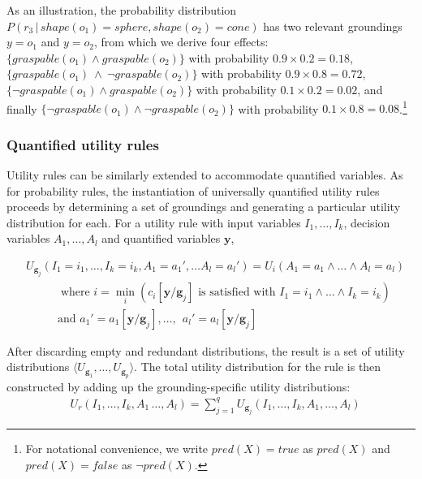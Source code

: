 As an illustration, the probability distribution $P(r_3 \, | \, \mathit{shape}(o_1)\!=\!\mathit{sphere}, \mathit{shape}(o_2)\!=\!\mathit{cone})$ has two relevant groundings $y\!=\!o_1$ and $y\!=\!o_2$, from which we derive four effects: $\{\mathit{graspable}(o_1) \land \mathit{graspable}(o_2) \} $ with probability $0.9\times0.2\!=\!0.18$, $\{\mathit{graspable}(o_1) \ \land \  \lnot\mathit{graspable}(o_2)\}$ with probability $0.9\times0.8\!=\!0.72$, $\{\lnot \mathit{graspable}(o_1) \land \mathit{graspable}(o_2) \}$ with probability $0.1\times0.2\!=\!0.02$, and finally $\{\lnot \mathit{graspable}(o_1) \land \lnot \mathit{graspable}(o_2)\}$ with probability $0.1\times0.8\!=\!0.08$.\footnote{For notational convenience, we write $pred(X)\!=\!true$ as $pred(X)$ and $pred(X)\!=\!false$ as $\lnot pred(X)$.}

\subsubsection*{Quantified utility rules}

Utility rules can be similarly extended to accommodate quantified variables. As for probability rules, the instantiation of universally quantified utility rules proceeds by determining a set of groundings and generating a particular utility distribution for each.%
 For a utility rule with input variables $I_1, \dots, I_k$, decision variables $A_1, \dots, A_l$ and quantified variables $\mathbf{y}$,
 
 \begin{align}
& U_{\mathbf{g}_j}(I_1\!=\!i_1, \dots, I_k\!=\!i_k, A_1\!=\!a_1', \dots A_l\!=\!a_l') = U_i(A_1\!=\!a_1 \land \dots \land A_l\!=\!a_l) 
 \\
& \; \; \; \; \; \; \; \;   \; \; \;\text{where } i = \min_i (c_i[\mathbf{y} / \mathbf{g}_j]\text{ is satisfied with } I_1\!=\!i_1 \land \dots \land I_k\!=\!i_k) \nonumber \\
& \; \; \; \; \; \; \; \;   \; \;  \text{and } a_1' = a_1[\mathbf{y} / \mathbf{g}_j], \dots, \ \ a_l' = a_l[\mathbf{y} / \mathbf{g}_j] \nonumber
\end{align}

After discarding empty and redundant distributions, the result is a set of utility distributions $ \langle U_{\mathbf{g}_1}, \dots, U_{\mathbf{g}_p} \rangle$. The total utility distribution for the rule is then constructed by adding up the grounding-specific utility distributions:   
\begin{align}
& U_{r}(I_1, \dots, I_k, A_1\, \dots, A_l) = \sum_{j=1}^{q} U_{\mathbf{g}_j}(I_1, \dots, I_k, A_1, \dots, A_l) \label{eq:quantifruledistrib}
\end{align}


